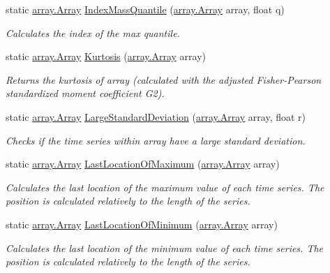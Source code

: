 \begin{DoxyCompactItemize}
static \mbox{\hyperlink{classkhiva_1_1array_1_1_array}{array.\+Array}} \mbox{\hyperlink{classkhiva_1_1features_1_1_features_a0fc139d3350ca0fa6774bd5a4003061a}{Index\+Mass\+Quantile}} (\mbox{\hyperlink{classkhiva_1_1array_1_1_array}{array.\+Array}} array, float q)
\begin{DoxyCompactList}\small\item\em Calculates the index of the max quantile. \end{DoxyCompactList}\item 
static \mbox{\hyperlink{classkhiva_1_1array_1_1_array}{array.\+Array}} \mbox{\hyperlink{classkhiva_1_1features_1_1_features_a911d30988298ecd88427bec4ee37d0c8}{Kurtosis}} (\mbox{\hyperlink{classkhiva_1_1array_1_1_array}{array.\+Array}} array)
\begin{DoxyCompactList}\small\item\em Returns the kurtosis of array (calculated with the adjusted Fisher-\/\+Pearson standardized moment coefficient G2). \end{DoxyCompactList}\item 
static \mbox{\hyperlink{classkhiva_1_1array_1_1_array}{array.\+Array}} \mbox{\hyperlink{classkhiva_1_1features_1_1_features_a70067042add15b9eb09cb155ba210b5d}{Large\+Standard\+Deviation}} (\mbox{\hyperlink{classkhiva_1_1array_1_1_array}{array.\+Array}} array, float r)
\begin{DoxyCompactList}\small\item\em Checks if the time series within array have a large standard deviation. \end{DoxyCompactList}\item 
static \mbox{\hyperlink{classkhiva_1_1array_1_1_array}{array.\+Array}} \mbox{\hyperlink{classkhiva_1_1features_1_1_features_a7131dcc52520fbddaf1e4906cda15423}{Last\+Location\+Of\+Maximum}} (\mbox{\hyperlink{classkhiva_1_1array_1_1_array}{array.\+Array}} array)
\begin{DoxyCompactList}\small\item\em Calculates the last location of the maximum value of each time series. The position is calculated relatively to the length of the series. \end{DoxyCompactList}\item 
static \mbox{\hyperlink{classkhiva_1_1array_1_1_array}{array.\+Array}} \mbox{\hyperlink{classkhiva_1_1features_1_1_features_aff001af10442ea2e923bf3d82a201e77}{Last\+Location\+Of\+Minimum}} (\mbox{\hyperlink{classkhiva_1_1array_1_1_array}{array.\+Array}} array)
\begin{DoxyCompactList}\small\item\em Calculates the last location of the minimum value of each time series. The position is calculated relatively to the length of the series. \end{DoxyCompactList}\item 

\end{DoxyCompactItemize}
